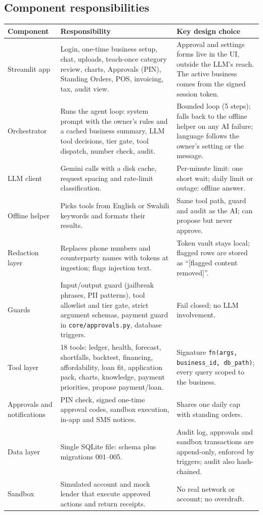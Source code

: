 \documentclass[10pt,a4paper]{article}
\newcommand{\code}[1]{\texttt{\small #1}}
\begin{document}
\subsection{Component responsibilities}
\begin{longtable}{@{}p{3.3cm}p{5.6cm}p{6.2cm}@{}}
\toprule
\textbf{Component} & \textbf{Responsibility} & \textbf{Key design choice}\\
\midrule\endhead
Streamlit app & Login, one-time business setup, chat, uploads, teach-once category review, charts, Approvals (PIN), Standing Orders, POS, invoicing, tax, audit view. & Approval and settings forms live in the UI, outside the LLM's reach. The active business comes from the signed session token.\\
Orchestrator & Runs the agent loop: system prompt with the owner's rules and a cached business summary, LLM tool decisions, tier gate, tool dispatch, number check, audit. & Bounded loop (5 steps); falls back to the offline helper on any AI failure; language follows the owner's setting or the message.\\
LLM client & Gemini calls with a disk cache, request spacing and rate-limit classification. & Per-minute limit: one short wait; daily limit or outage: offline answer.\\
Offline helper & Picks tools from English or Swahili keywords and formats their results. & Same tool path, guard and audit as the AI; can propose but never approve.\\
Redaction layer & Replaces phone numbers and counterparty names with tokens at ingestion; flags injection text. & Token vault stays local; flagged rows are stored as ``[flagged content removed]''.\\
Guards & Input/output guard (jailbreak phrases, PII patterns), tool allowlist and tier gate, strict argument schemas, payment guard in \code{core/approvals.py}, database triggers. & Fail closed; no LLM involvement.\\
Tool layer & 18 tools: ledger, health, forecast, shortfalls, backtest, financing, affordability, loan fit, application pack, charts, knowledge, payment priorities, propose payment/loan. & Signature \code{fn(args, business\_id, db\_path)}; every query scoped to the business.\\
Approvals and notifications & PIN check, signed one-time approval codes, sandbox execution, in-app and SMS notices. & Shares one daily cap with standing orders.\\
Data layer & Single SQLite file: schema plus migrations 001--005. & Audit log, approvals and sandbox transactions are append-only, enforced by triggers; audit also hash-chained.\\
Sandbox & Simulated account and mock lender that execute approved actions and return receipts. & No real network or account; no overdraft.\\
\bottomrule
\end{longtable}
\end{document}
